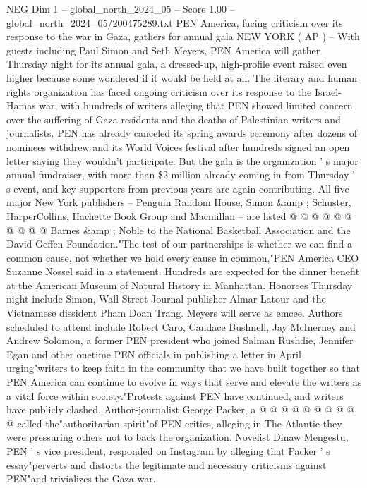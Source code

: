 \begin{textsample}{NEG Dim 1 – global\_north\_2024\_05 – Score 1.00 – global\_north\_2024\_05/200475289.txt}  \label{ex:f1_neg_175}
PEN America, facing criticism over its response to the war in Gaza, gathers for annual gala NEW YORK ( AP ) -- With guests including Paul Simon and Seth Meyers, PEN America will gather Thursday night for its annual gala, a dressed-up, high-profile event raised even higher because some wondered if it would be held at all.
The literary and human rights organization has faced ongoing criticism over its response to the Israel-Hamas war, with hundreds of writers alleging that PEN showed limited concern over the suffering of Gaza residents and the deaths of Palestinian writers and journalists.
PEN has already canceled its spring awards ceremony after dozens of nominees withdrew and its World Voices festival after hundreds signed an open letter saying they wouldn't participate.
But the gala is the organization ' s major annual fundraiser, with more than \$2 million already coming in from Thursday ' s event, and key supporters from previous years are again contributing.
All five major New York publishers -- Penguin Random House, Simon \&amp ; Schuster, HarperCollins, Hachette Book Group and Macmillan -- are listed @ @ @ @ @ @ @ @ @ @ Barnes \&amp ; Noble to the National Basketball Association and the David Geffen Foundation."The test of our partnerships is whether we can find a common cause, not whether we hold every cause in common,"PEN America CEO Suzanne Nossel said in a statement.
Hundreds are expected for the dinner benefit at the American Museum of Natural History in Manhattan.
Honorees Thursday night include Simon, Wall Street Journal publisher Almar Latour and the Vietnamese dissident Pham Doan Trang.
Meyers will serve as emcee.
Authors scheduled to attend include Robert Caro, Candace Bushnell, Jay McInerney and Andrew Solomon, a former PEN president who joined Salman Rushdie, Jennifer Egan and other onetime PEN officials in publishing a letter in April urging"writers to keep faith in the community that we have built together so that PEN America can continue to evolve in ways that serve and elevate the writers as a vital force within society."Protests against PEN have continued, and writers have publicly clashed.
Author-journalist George Packer, a @ @ @ @ @ @ @ @ @ @ called the"authoritarian spirit"of PEN critics, alleging in The Atlantic they were pressuring others not to back the organization.
Novelist Dinaw Mengestu, PEN ' s vice president, responded on Instagram by alleging that Packer ' s essay"perverts and distorts the legitimate and necessary criticisms against PEN"and trivializes the Gaza war.

\end{textsample}
